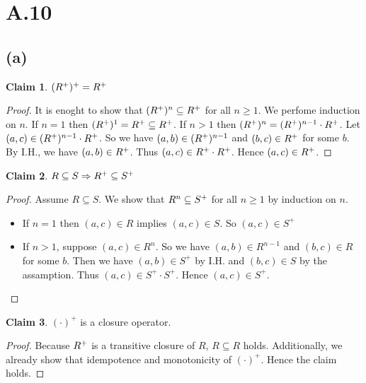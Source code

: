\documentclass[autodetect-enginem]{article}
\theoremstyle{plain}
\theoremstyle{definition}
\theoremstyle{definition}
\newtheorem*{claim}{Claim}
\begin{document}
\section*{A.10}
\subsection*{(a)}

\begin{claim}
    $(R^{+})^+ = R^{+}$
\end{claim}

\begin{proof}
    It is enoght to show that $(R^{+})^n \subseteq R^{+}$ for all $n \geq 1$.
    We perfome induction on $n$.
    If $n = 1$ then $(R^{+})^1 = R^{+} \subseteq R^{+}$.
    If $n > 1$ then $(R^{+})^n = (R^{+})^{n-1} \cdot R^{+}$. Let $(a,c) \in (R^{+})^{n-1} \cdot R^{+}$.
    So we have $(a,b) \in (R^{+})^{n-1}$ and $(b,c) \in R^{+}$ for some $b$.
    By I.H., we have $(a,b) \in R^{+}$. Thus $(a,c) \in R^{+} \cdot R^{+}$.
    Hence $(a,c) \in R^{+}$.
\end{proof}

\newcommand{\SP}{S^{+}}
\begin{claim}
    $R \subseteq S \Rightarrow \RP \subseteq \SP$
\end{claim}

\begin{proof}
    Assume $R \subseteq S$.
    We show that $\RN \subseteq \SP$ for all $n \geq 1$ by induction on $n$.
    \begin{itemize}
        \item If $n = 1$ then $(a,c) \in R$ implies $(a,c) \in S$. So $(a,c) \in \SP$
        \item If $n > 1$, suppose $(a,c) \in R^{n}$. So we have $(a,b) \in R^{n-1}$ and $(b,c) \in R$ for some $b$.
              Then we have $(a,b) \in \SP$ by I.H. and  $(b,c) \in S$ by the assamption.
              Thus $(a,c) \in \SP \cdot \SP$.
              Hence $(a,c) \in \SP$.
    \end{itemize}
\end{proof}

\begin{claim}
    $(\cdot)^+$ is a closure operator.
\end{claim}

\begin{proof}
    Because $R^{+}$ is a transitive closure of $R$, $R \subseteq R$ holds.
    Additionally, we already show that idempotence and monotonicity of $(\cdot)^{+}$.
    Hence the claim holds.
\end{proof}
\end{document}
